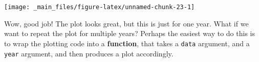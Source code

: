 \documentclass[]{book}
\newenvironment{Shaded}{\begin{snugshade}}{\end{snugshade}}
\newcommand{\KeywordTok}[1]{\textcolor[rgb]{0.13,0.29,0.53}{\textbf{{#1}}}}
\newcommand{\DataTypeTok}[1]{\textcolor[rgb]{0.13,0.29,0.53}{{#1}}}
\newcommand{\DecValTok}[1]{\textcolor[rgb]{0.00,0.00,0.81}{{#1}}}
\newcommand{\FloatTok}[1]{\textcolor[rgb]{0.00,0.00,0.81}{{#1}}}
\newcommand{\StringTok}[1]{\textcolor[rgb]{0.31,0.60,0.02}{{#1}}}
\newcommand{\NormalTok}[1]{{#1}}
\theoremstyle{definition}
\theoremstyle{definition}
\theoremstyle{definition}
\theoremstyle{remark}
\begin{document}
\begin{Shaded}
\end{Shaded}

\begin{center}\texttt{[image: \_main\_files/figure-latex/unnamed-chunk-23-1]} \end{center}

Wow, good job! The plot looks great, but this is just for one year. What
if we want to repeat the plot for multiple years? Perhaps the easiest
way to do this is to wrap the plotting code into a \textbf{function},
that takes a \texttt{data} argument, and a \texttt{year} argument, and
then produces a plot accordingly.
\end{document}

